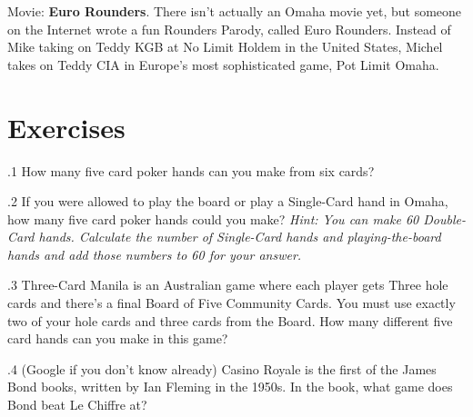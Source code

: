 Movie: \textbf{Euro Rounders}. There isn't actually an Omaha movie
yet, but someone on the Internet wrote a fun Rounders Parody, called
Euro Rounders. Instead of Mike taking on Teddy KGB at No Limit Holdem
in the United States, Michel takes on Teddy CIA in Europe's most
sophisticated game, Pot Limit Omaha.

\section{Exercises}

.1 How many five card poker hands can you make from
six cards?

.2 If you were allowed to play the board or play a
Single-Card hand in Omaha, how many five card poker hands could you
make? \textit{Hint: You can make 60 Double-Card hands. Calculate the
number of Single-Card hands and playing-the-board hands and add those
numbers to 60 for your answer.}

.3 Three-Card Manila is an Australian game where each
player gets Three hole cards and there's a final Board of Five
Community Cards. You must use exactly two of your hole cards and three
cards from the Board. How many different five card hands can you make
in this game?

.4 (Google if you don't know already) Casino Royale
is the first of the James Bond books, written by Ian Fleming in the
1950s. In the book, what game does Bond beat Le Chiffre at?

